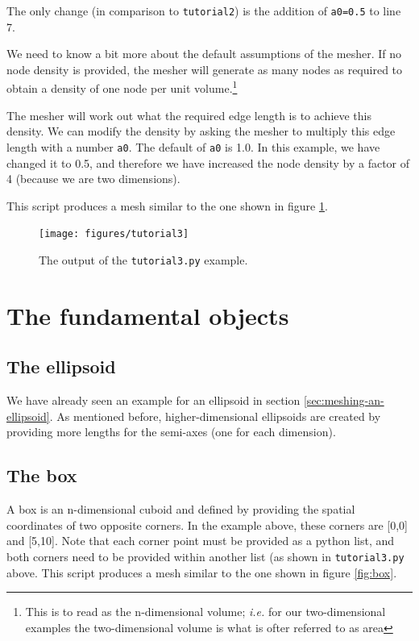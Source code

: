 \documentclass[10pt,a4paper]{book}
\newcommand{\py}[1]{\texttt{\color{blue}#1}}
\begin{document}
The only change (in comparison to \texttt{tutorial2}) is the addition
of \py{a0=0.5} to line 7.

We need to know a bit more about the default assumptions of the
mesher. If no node density is provided, the mesher will generate as
many nodes as required to obtain a density of one node per unit
volume.\footnote{This is to read as the n-dimensional volume; \emph{i.e.} for
our two-dimensional examples the two-dimensional volume is what is
ofter referred to as area}

The mesher will work out what the required edge length is to achieve
this density. We can modify the density by asking the mesher to
multiply this edge length with a number \py{a0}. The default of
\py{a0} is 1.0. In this example, we have changed it to 0.5, and
therefore we have increased the node density by a factor of 4 (because
we are two dimensions).

This script produces a mesh similar to the one shown in figure
\ref{fig:tutorial3}.

\begin{figure}[tbh]
\centerline{\texttt{[image: figures/tutorial3]}}
\caption{\label{fig:tutorial3}The output of  the \py{tutorial3.py} example.}
\end{figure}


\section{The fundamental objects}
\label{sec:fundamentalobjects}

\subsection{The ellipsoid}
We have already seen an example for an ellipsoid in section \ref{sec:meshing-an-ellipsoid}. As mentioned before, higher-dimensional ellipsoids are created by providing more lengths for the semi-axes (one for each dimension).
\subsection{The box}



A box is an n-dimensional cuboid and defined by providing the spatial coordinates of two opposite corners. In the example above, these corners are [0,0] and [5,10]. Note that each corner point must be provided as a python list, and both corners need to be provided within another list (as shown in \texttt{tutorial3.py} above. This script produces a mesh similar to the one shown in figure \ref{fig:box}.
\end{document}
